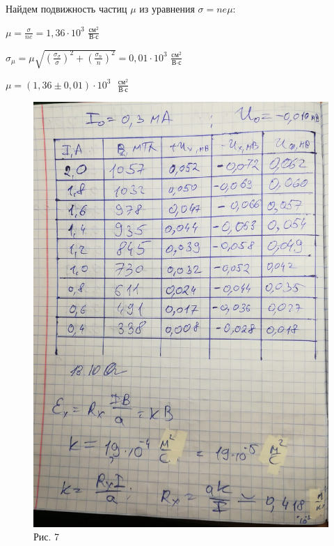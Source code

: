 \documentclass[a4paper,12pt]{article} %
\begin{document}
\vspace{7mm}
Найдем подвижность частиц $\mu$ из уравнения $\sigma = ne\mu$:

$\mu = \frac{\sigma}{ne} = 1,36\cdot 10^3$ $\frac{\text{см}^2}{\text{В}\cdot\text{с}}$

$\sigma_{\mu} = \mu \sqrt{\left(\frac{\sigma_{\sigma}}{\sigma}\right)^2 + \left(\frac{\sigma_n}{n}\right)^2} = 0,01\cdot 10^3$ $\frac{\text{см}^2}{\text{В}\cdot\text{с}}$

\vspace{3mm}
$\boxed{\mu = (1,36 \pm 0,01)\cdot 10^3 \text{ }\frac{\text{см}^2}{\text{В}\cdot\text{с}}}$

\begin{figure}[h!]
	\centering
	\includegraphics[scale=0.4]{Pictures/Подпись.jpg}
	\caption*{Рис. 7}
\end{figure}
\end{document}
